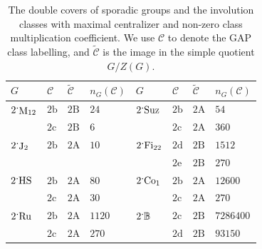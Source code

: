 \documentclass[11pt,a4paper]{amsart}
\theoremstyle{plain}
\theoremstyle{definition}
\theoremstyle{remark}
\theoremstyle{remark}
\theoremstyle{remark}
\theoremstyle{definition}
\newcommand{\ns}{\mathbin{\mspace{-4mu}\vcenter{\hbox{\raisebox{1ex}{$\cdot$}}}\mspace{-4mu}}}
\newcommand{\BM}{\mathbb{B}}
\DeclareMathOperator{\M}{M}
\DeclareMathOperator{\HS}{HS}
\DeclareMathOperator{\J}{J}
\DeclareMathOperator{\Suz}{Suz}
\DeclareMathOperator{\Co}{Co}
\DeclareMathOperator{\Ru}{Ru}
\DeclareMathOperator{\Fi}{Fi}
\begin{document}
\begin{table}[H]
   \begin{center}
\begin{tabular}{|llll|llll|}
\hline
$G$           & $\mathcal{C}$ & $\widetilde{\mathcal{C}}$ & $n_G(\mathcal{C})$ & $G$            & $\mathcal{C}$ & $\widetilde{\mathcal{C}}$ & $n_G(\mathcal{C})$ \\ \hline
$2\ns\M_{12}$ & $\mathrm{2b}$ & $\mathrm{2B}$             & $24$               & $2\ns\Suz$     & $\mathrm{2b}$ & $\mathrm{2A}$             & $54$               \\
              & $\mathrm{2c}$ & $\mathrm{2B}$             & $6$                &                & $\mathrm{2c}$ & $\mathrm{2A}$             & $360$              \\\hline
$2\ns\J_2$    & $\mathrm{2b}$ & $\mathrm{2A}$             & $10$               & $2\ns\Fi_{22}$ & $\mathrm{2d}$ & $\mathrm{2B}$             & $1512$             \\
              &               &                           &                    &                & $\mathrm{2e}$ & $\mathrm{2B}$             & $270$              \\\hline
$2\ns\HS$     & $\mathrm{2b}$ & $\mathrm{2A}$             & $80$               & $2\ns\Co_1$    & $\mathrm{2b}$ & $\mathrm{2A}$             & $12600$            \\
              & $\mathrm{2c}$ & $\mathrm{2A}$             & $30$               &                & $\mathrm{2c}$ & $\mathrm{2A}$             & $270$              \\\hline
$2\ns\Ru$     & $\mathrm{2b}$ & $\mathrm{2A}$             & $1120$             & $2\ns\BM$      & $\mathrm{2c}$ & $\mathrm{2B}$             & $7286400$          \\
              & $\mathrm{2c}$ & $\mathrm{2A}$             & $270$              &                & $\mathrm{2d}$ & $\mathrm{2B}$             & $93150$           \\\hline
\end{tabular}
\end{center}
\caption{The double covers of sporadic groups and the involution classes with maximal centralizer and non-zero class multiplication coefficient. We use $\mathcal{C}$ to denote the {\sf GAP} class labelling, and $\widetilde{\mathcal{C}}$ is the image in the simple quotient $G/Z(G)$.}
\label{tab:doublecovercoefficients}
\end{table}
\end{document}
